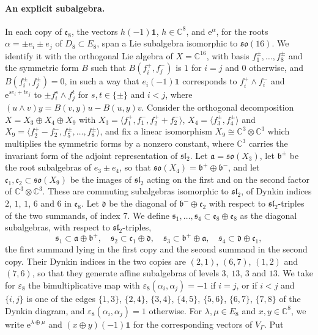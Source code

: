 \documentclass[leqno]{article}
\newcommand{\Cbb}{\ensuremath{\mathbb{C}}}
\newcommand{\ot}{\otimes}
\newcommand{\epsi}{\varepsilon}
\newcommand{\e}{\mathrm{e}} %
\numberwithin{equation}{section}
\begin{document}
\paragraph{An explicit subalgebra.} In each copy of $\mathfrak e_8$, the vectors $h(-1)\mathbf 1$, $h \in \Cbb^8$, and $\e^\alpha$, for the roots $\alpha = \pm e_i \pm e_j$ of $D_8 \subset E_8$, span a Lie subalgebra isomorphic to $\mathfrak{so}(16)$. We identify it with the orthogonal Lie algebra of $X = \Cbb^{16}$, with basis $f_1^\pm, \ldots, f_8^\pm$ and the symmetric form $B$ such that $B(f_i^+,f_j^-)$ is $1$ for $i = j$ and $0$ otherwise, and $B(f_i^\pm,f_j^\pm) = 0$, in such a way that $e_i(-1)\mathbf 1$ corresponds to $f_i^+ \wedge f_i^-$ and $\e^{s e_i+t e_j}$ to $\pm f_i^s \wedge f_j^t$ for $s,t \in \{\pm\}$ and $i < j$, where $(u \wedge v)y = B(v,y)u-B(u,y)v$. Consider the orthogonal decomposition $X = X_3 \oplus X_4 \oplus X_9$ with $X_3 = \langle f_1^+,f_1^-,f_2^++f_2^-\rangle$, $X_4 = \langle f_3^\pm,f_4^\pm\rangle$ and $X_9 = \langle f_2^+-f_2^-,f_5^\pm,\ldots,f_8^\pm\rangle$, and fix a linear isomorphism $X_9 \cong \Cbb^3 \ot \Cbb^3$ which multiplies the symmetric forms by a nonzero constant, where $\Cbb^3$ carries the invariant form of the adjoint representation of $\mathfrak{sl}_2$. Let $\mathfrak a = \mathfrak{so}(X_3)$, let $\mathfrak b^\pm$ be the root subalgebras of $e_3 \pm e_4$, so that $\mathfrak{so}(X_4) = \mathfrak b^+ \oplus \mathfrak b^-$, and let $\mathfrak c_1, \mathfrak c_2 \subset \mathfrak{so}(X_9)$ be the images of $\mathfrak{sl}_2$ acting on the first and on the second factor of $\Cbb^3 \ot \Cbb^3$. These are commuting subalgebras isomorphic to $\mathfrak{sl}_2$, of Dynkin indices $2$, $1$, $1$, $6$ and $6$ in $\mathfrak e_8$. Let $\mathfrak d$ be the diagonal of $\mathfrak b^- \oplus \mathfrak c_2$ with respect to $\mathfrak{sl}_2$-triples of the two summands, of index $7$. We define $\mathfrak s_1, \ldots, \mathfrak s_4 \subset \mathfrak e_8 \oplus \mathfrak e_8$ as the diagonal subalgebras, with respect to $\mathfrak{sl}_2$-triples,
\[
\mathfrak s_1 \subset \mathfrak a \oplus \mathfrak b^+,\quad \mathfrak s_2 \subset \mathfrak c_1 \oplus \mathfrak d,\quad \mathfrak s_3 \subset \mathfrak b^+ \oplus \mathfrak a,\quad \mathfrak s_4 \subset \mathfrak d \oplus \mathfrak c_1,
\]
the first summand lying in the first copy and the second summand in the second copy. Their Dynkin indices in the two copies are $(2,1)$, $(6,7)$, $(1,2)$ and $(7,6)$, so that they generate affine subalgebras of levels $3$, $13$, $3$ and $13$. We take for $\epsi_8$ the bimultiplicative map with $\epsi_8(\alpha_i,\alpha_j) = -1$ if $i = j$, or if $i < j$ and $\{i,j\}$ is one of the edges $\{1,3\}$, $\{2,4\}$, $\{3,4\}$, $\{4,5\}$, $\{5,6\}$, $\{6,7\}$, $\{7,8\}$ of the Dynkin diagram, and $\epsi_8(\alpha_i,\alpha_j) = 1$ otherwise. For $\lambda,\mu \in E_8$ and $x,y \in \Cbb^8$, we write $\e^{\lambda \oplus \mu}$ and $(x \oplus y)(-1)\mathbf 1$ for the corresponding vectors of $V_\Gamma$. Put
\end{document}
